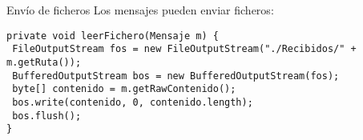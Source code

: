 \documentclass[compress]{beamer}
\begin{document}
\begin{frame}[fragile]{Envío de ficheros}
  Los mensajes pueden enviar ficheros:
  \begin{lstlisting}
private void leerFichero(Mensaje m) {
 FileOutputStream fos = new FileOutputStream("./Recibidos/" + m.getRuta());
 BufferedOutputStream bos = new BufferedOutputStream(fos);
 byte[] contenido = m.getRawContenido();
 bos.write(contenido, 0, contenido.length);
 bos.flush();
}
  \end{lstlisting}

\end{frame}
\end{document}

